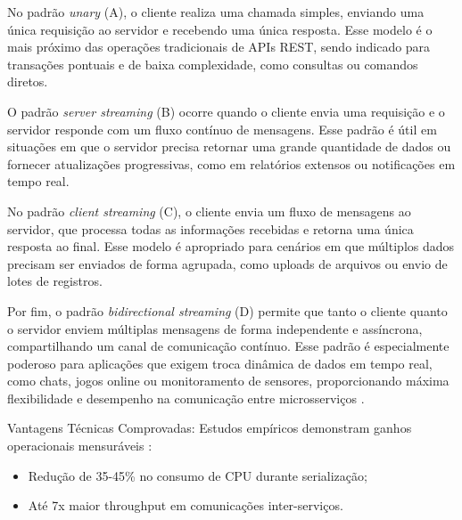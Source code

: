 No padrão \textit{unary} (A), o cliente realiza uma chamada simples, enviando uma única requisição ao servidor e recebendo uma única resposta. Esse modelo é o mais próximo das operações tradicionais de APIs REST, sendo indicado para transações pontuais e de baixa complexidade, como consultas ou comandos diretos.

O padrão \textit{server streaming} (B) ocorre quando o cliente envia uma requisição e o servidor responde com um fluxo contínuo de mensagens. Esse padrão é útil em situações em que o servidor precisa retornar uma grande quantidade de dados ou fornecer atualizações progressivas, como em relatórios extensos ou notificações em tempo real.

No padrão \textit{client streaming} (C), o cliente envia um fluxo de mensagens ao servidor, que processa todas as informações recebidas e retorna uma única resposta ao final. Esse modelo é apropriado para cenários em que múltiplos dados precisam ser enviados de forma agrupada, como uploads de arquivos ou envio de lotes de registros.

Por fim, o padrão \textit{bidirectional streaming} (D) permite que tanto o cliente quanto o servidor enviem múltiplas mensagens de forma independente e assíncrona, compartilhando um canal de comunicação contínuo. Esse padrão é especialmente poderoso para aplicações que exigem troca dinâmica de dados em tempo real, como chats, jogos online ou monitoramento de sensores, proporcionando máxima flexibilidade e desempenho na comunicação entre microsserviços \cite{niswar2023performance, shekhar2023microservices}.

Vantagens Técnicas Comprovadas: Estudos empíricos demonstram ganhos operacionais mensuráveis \cite{niswar2023performance}:
\begin{itemize}
    \item Redução de 35-45\% no consumo de CPU durante serialização;
    \item Até 7x maior throughput em comunicações inter-serviços.
\end{itemize}


